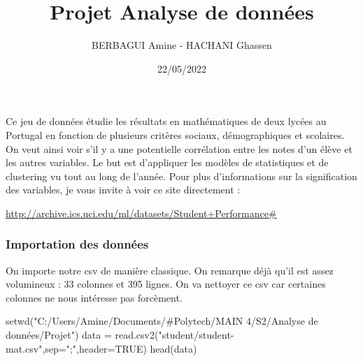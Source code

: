 \documentclass[
]{article}
\title{Projet Analyse de données}
\author{BERBAGUI Amine - HACHANI Ghassen}
\date{22/05/2022}
\newenvironment{Shaded}{\begin{snugshade}}{\end{snugshade}}
\newcommand{\AttributeTok}[1]{\textcolor[rgb]{0.77,0.63,0.00}{#1}}
\newcommand{\ConstantTok}[1]{\textcolor[rgb]{0.00,0.00,0.00}{#1}}
\newcommand{\FunctionTok}[1]{\textcolor[rgb]{0.00,0.00,0.00}{#1}}
\newcommand{\NormalTok}[1]{#1}
\newcommand{\OtherTok}[1]{\textcolor[rgb]{0.56,0.35,0.01}{#1}}
\newcommand{\StringTok}[1]{\textcolor[rgb]{0.31,0.60,0.02}{#1}}
\begin{document}
\maketitle

{
\setcounter{tocdepth}{4}
\tableofcontents
}
Ce jeu de données étudie les résultats en mathématiques de deux lycées
au Portugal en fonction de plusieurs critères sociaux, démographiques et
scolaires. On veut ainsi voir s'il y a une potentielle corrélation entre
les notes d'un élève et les autres variables. Le but est d'appliquer les
modèles de statistiques et de clustering vu tout au long de l'année.
Pour plus d'informations sur la signification des variables, je vous
invite à voir ce site directement :

\url{http://archive.ics.uci.edu/ml/datasets/Student+Performance\#}

\hypertarget{importation-des-donnuxe9es}{%
\subsubsection{Importation des
données}\label{importation-des-donnuxe9es}}

On importe notre csv de manière classique. On remarque déjà qu'il est
assez volumineux : 33 colonnes et 395 lignes. On va nettoyer ce csv car
certaines colonnes ne nous intéresse pas forcèment.

\begin{Shaded}
\begin{Highlighting}[]
\FunctionTok{setwd}\NormalTok{(}\StringTok{"C:/Users/Amine/Documents/\#Polytech/MAIN 4/S2/Analyse de données/Projet"}\NormalTok{)}
\NormalTok{data }\OtherTok{=} \FunctionTok{read.csv2}\NormalTok{(}\StringTok{"student/student{-}mat.csv"}\NormalTok{,}\AttributeTok{sep=}\StringTok{";"}\NormalTok{,}\AttributeTok{header=}\ConstantTok{TRUE}\NormalTok{)}
\FunctionTok{head}\NormalTok{(data)}
\end{Highlighting}
\end{Shaded}
\end{document}
